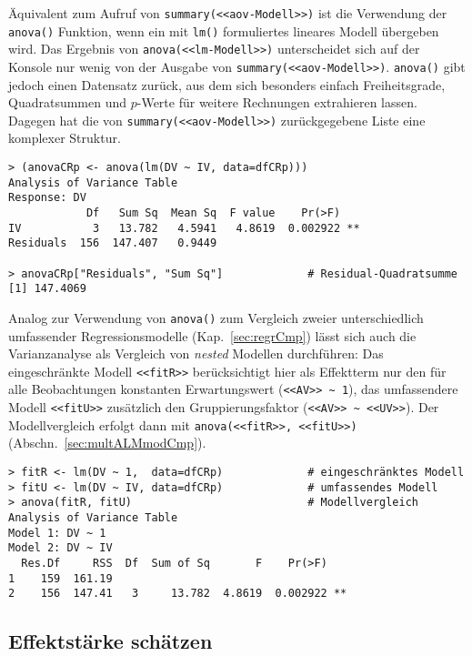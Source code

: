 Äquivalent zum Aufruf von \lstinline!summary(<<aov-Modell>>)! ist die Verwendung der \lstinline!anova()! Funktion, wenn ein mit \lstinline!lm()! formuliertes lineares Modell übergeben wird. Das Ergebnis von \lstinline!anova(<<lm-Modell>>)! unterscheidet sich auf der Konsole nur wenig von der Ausgabe von \lstinline!summary(<<aov-Modell>>)!. \lstinline!anova()! gibt jedoch einen Datensatz zurück, aus dem sich besonders einfach Freiheitsgrade, Quadratsummen und $p$-Werte für weitere Rechnungen extrahieren lassen. Dagegen hat die von \lstinline!summary(<<aov-Modell>>)! zurückgegebene Liste eine komplexer Struktur.
\begin{lstlisting}
> (anovaCRp <- anova(lm(DV ~ IV, data=dfCRp)))
Analysis of Variance Table
Response: DV
            Df   Sum Sq  Mean Sq  F value    Pr(>F)
IV           3   13.782   4.5941   4.8619  0.002922 **
Residuals  156  147.407   0.9449

> anovaCRp["Residuals", "Sum Sq"]             # Residual-Quadratsumme
[1] 147.4069
\end{lstlisting}

Analog zur Verwendung von \lstinline!anova()! zum Vergleich zweier unterschiedlich umfassender Regressionsmodelle (Kap.\ \ref{sec:regrCmp}) lässt sich auch die Varianzanalyse als Vergleich von \emph{nested} Modellen durchführen: Das eingeschränkte Modell \lstinline!<<fitR>>! berücksichtigt hier als Effektterm nur den für alle Beobachtungen konstanten Erwartungswert (\lstinline!<<AV>> ~ 1!), das umfassendere Modell \lstinline!<<fitU>>! zusätzlich den Gruppierungsfaktor (\lstinline!<<AV>> ~ <<UV>>!). Der Modellvergleich erfolgt dann mit \lstinline!anova(<<fitR>>, <<fitU>>)! (Abschn.\ \ref{sec:multALMmodCmp}).
\begin{lstlisting}
> fitR <- lm(DV ~ 1,  data=dfCRp)             # eingeschränktes Modell
> fitU <- lm(DV ~ IV, data=dfCRp)             # umfassendes Modell
> anova(fitR, fitU)                           # Modellvergleich
Analysis of Variance Table
Model 1: DV ~ 1
Model 2: DV ~ IV
  Res.Df     RSS  Df  Sum of Sq       F    Pr(>F)
1    159  161.19
2    156  147.41   3     13.782  4.8619  0.002922 **
\end{lstlisting}

\subsection{Effektstärke schätzen}
\label{sec:CRpEff}

